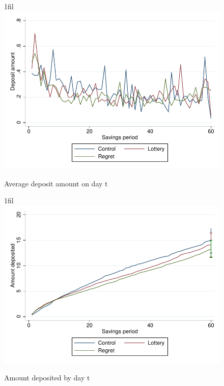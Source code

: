 \documentclass[10pt]{article}
\makeatletter
\newcommand*{\centerfloat}{%
  \parindent \z@
  \leftskip \z@ \@plus 1fil \@minus \textwidth
  \rightskip\leftskip
  \parfillskip \z@skip}
\makeatother
\begin{document}
		\begin{figure}[!htb]
		\centering
		\caption{Average deposit amount on day t}
		\centerfloat
		\includegraphics{../../figures/line-depositamount.pdf}
		\end{figure}

		\begin{figure}[!htb]
		\centering
		\caption{Amount deposited by day t}
		\centerfloat
		\includegraphics{../../figures/line-cumdepositamount.pdf}
		\end{figure}
\end{document}
